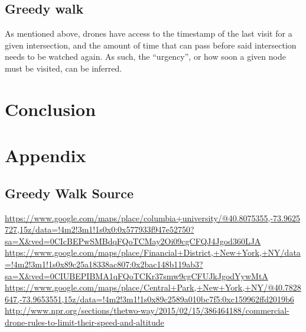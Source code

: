 \documentclass{article}
\begin{document}
\subsection{Greedy walk}
\label{sub:greedy_walk}
As mentioned above, drones have access to the timestamp of the last visit for a given intersection, and the amount of time that can pass before said intersection needs to be watched again. As such, the ``urgency'', or how soon a given node must be visited, can be inferred.

\section{Conclusion}
\label{sec:conclusion}


\section{Appendix}
\label{sec:appendix}

\subsection{Greedy Walk Source}
\label{sub:greedy_walk_source}



\begin{thebibliography}{9}
    \url{https://www.google.com/maps/place/columbia+university/@40.8075355,-73.9625727,15z/data=!4m2!3m1!1s0x0:0x577933f947e52750?sa=X&ved=0CIcBEPwSMBdqFQoTCMay2Oi09cgCFQJ4Jgod360LJA}
    \url{https://www.google.com/maps/place/Financial+District,+New+York,+NY/data=!4m2!3m1!1s0x89c25a18338ac807:0x2bac148b119ab3?sa=X&ved=0CIUBEPIBMA1qFQoTCKr37smw9cgCFUJkJgodYywMtA}
    \url{https://www.google.com/maps/place/Central+Park,+New+York,+NY/@40.7828647,-73.9653551,15z/data=!4m2!3m1!1s0x89c2589a010bc7f5:0xc159962ffd2019b6}
    \url{http://www.npr.org/sections/thetwo-way/2015/02/15/386464188/commercial-drone-rules-to-limit-their-speed-and-altitude}
\end{thebibliography}
\end{document}

